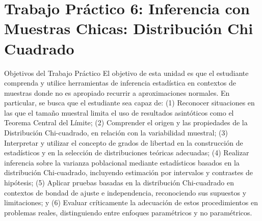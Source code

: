 \documentclass[
  spanish,
  letterpaper,
  DIV=11,
  numbers=noendperiod]{scrreprt}
\begin{document}

\chapter{Trabajo Práctico 6: Inferencia con Muestras Chicas:
Distribución Chi
Cuadrado}\label{trabajo-pruxe1ctico-6-inferencia-con-muestras-chicas-distribuciuxf3n-chi-cuadrado}

Objetivos del Trabajo Práctico El objetivo de esta unidad es que el
estudiante comprenda y utilice herramientas de inferencia estadística en
contextos de muestras donde no es apropiado recurrir a aproximaciones
normales. En particular, se busca que el estudiante sea capaz de: (1)
Reconocer situaciones en las que el tamaño muestral limita el uso de
resultados asintóticos como el Teorema Central del Límite; (2)
Comprender el origen y las propiedades de la Distribución Chi-cuadrado,
en relación con la variabilidad muestral; (3) Interpretar y utilizar el
concepto de grados de libertad en la construcción de estadísticos y en
la selección de distribuciones teóricas adecuadas; (4) Realizar
inferencia sobre la varianza poblacional mediante estadísticos basados
en la distribución Chi-cuadrado, incluyendo estimación por intervalos y
contrastes de hipótesis; (5) Aplicar pruebas basadas en la distribución
Chi-cuadrado en contextos de bondad de ajuste e independencia,
reconociendo sus supuestos y limitaciones; y (6) Evaluar críticamente la
adecuación de estos procedimientos en problemas reales, distinguiendo
entre enfoques paramétricos y no paramétricos.
\end{document}
